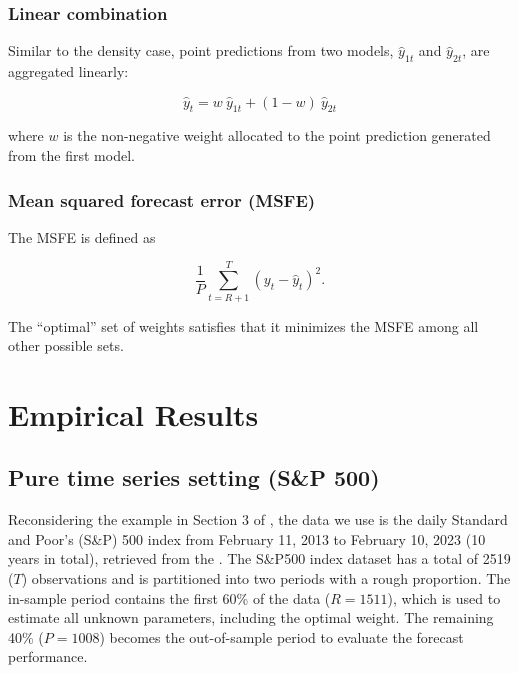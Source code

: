 \documentclass{monashthesis}
\begin{document}
\hypertarget{linear-combination}{%
\subsection{Linear combination}\label{linear-combination}}

Similar to the density case, point predictions from two models, \(\hat y_{1t}\) and \(\hat y_{2t}\), are aggregated linearly:

\begin{equation}
\label{eqn:PC1}
\hat y_t = w \ \hat y_{1t} + (1-w) \ \hat y_{2t}
\end{equation}

where \(w\) is the non-negative weight allocated to the point prediction generated from the first model.

\hypertarget{mean-squared-forecast-error-msfe}{%
\subsection{Mean squared forecast error (MSFE)}\label{mean-squared-forecast-error-msfe}}

The MSFE is defined as

\begin{equation}
\label{eqn:MSFE1}
\frac{1}{P} \sum^T_{t=R+1} (y_t - \hat y_t)^2.
\end{equation}

The ``optimal'' set of weights satisfies that it minimizes the MSFE among all other possible sets.

\hypertarget{empirical-results}{%
\chapter{Empirical Results}\label{empirical-results}}

\hypertarget{pure-time-series-setting-sp-500}{%
\section{Pure time series setting (S\&P 500)}\label{pure-time-series-setting-sp-500}}

Reconsidering the example in Section 3 of \textcite{GA11}, the data we use is the daily Standard and Poor's (S\&P) 500 index from February 11, 2013 to February 10, 2023 (10 years in total), retrieved from the \textcite{SP500}. The S\&P500 index dataset has a total of 2519 (\(T\)) observations and is partitioned into two periods with a rough proportion. The in-sample period contains the first 60\% of the data (\(R = 1511\)), which is used to estimate all unknown parameters, including the optimal weight. The remaining 40\% (\(P = 1008\)) becomes the out-of-sample period to evaluate the forecast performance.
\end{document}
